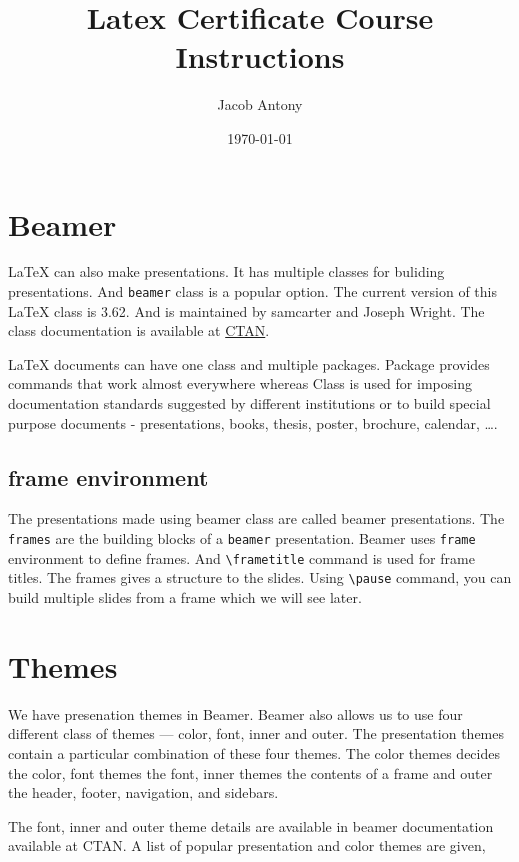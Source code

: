 \documentclass{article}
\title{Latex Certificate Course Instructions}
\author{Jacob Antony}
\date{\today}
\begin{document}
\maketitle

\section{Beamer}
	\LaTeX{} can also make presentations. It has multiple classes for buliding presentations. And \texttt{beamer} class is a popular option. The current version of this \LaTeX{} class is 3.62. And is maintained by samcarter and Joseph Wright. The class documentation is available at \href{https://ctan.org/pkg/beamer}{CTAN}.
	
	\LaTeX{} documents can have one class and multiple packages. Package provides commands that work almost everywhere whereas Class is used for imposing documentation standards suggested by different institutions or to build special purpose documents - presentations, books, thesis, poster, brochure, calendar, \dots .
	
\subsection{frame environment}
	The presentations made using beamer class are called beamer presentations. The \texttt{frames} are the building blocks of a \texttt{beamer} presentation. Beamer uses \texttt{frame} environment to define frames. And \texttt{\textbackslash frametitle} command is used for frame titles. The frames gives a structure to the slides. Using \texttt{\textbackslash pause} command, you can build multiple slides from a frame which we will see later.

\section{Themes}
	We have presenation themes in Beamer. Beamer also allows us to use four different class of themes --- color, font, inner and outer. The presentation themes contain a particular combination of these four themes. The color themes decides the color, font themes the font, inner themes the contents of a frame and outer the header, footer, navigation, and sidebars.

	The font, inner and outer theme details are available in beamer documentation available at CTAN. A list of popular presentation and color themes are given,
\end{document}
